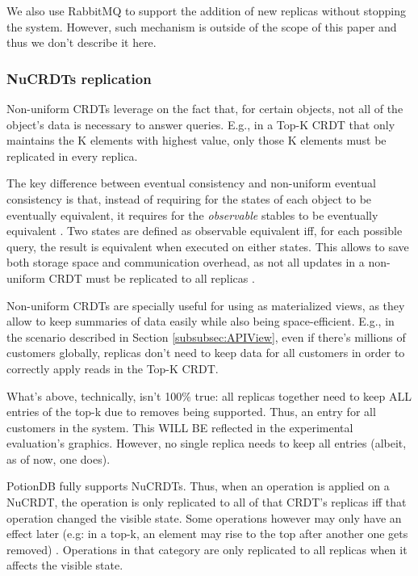 \documentclass{vldb}
\newcommand{\grumbler}[2]{{\color{red}{\bf #1:} #2}}
\newcommand{\andre}[1]{\grumbler{andre}{#1}}
\begin{document}
We also use RabbitMQ to support the addition of new replicas without stopping the system.
However, such mechanism is outside of the scope of this paper and thus we don't describe it here.

\subsubsection{NuCRDTs replication}
\label{subsubsec:nureplication}

Non-uniform CRDTs \cite{???} leverage on the fact that, for certain objects, not all of the object's data is necessary to answer queries.
E.g., in a Top-K CRDT that only maintains the K elements with highest value, only those K elements must be replicated in every replica.

The key difference between eventual consistency and non-uniform eventual consistency is that, instead of requiring for the states of each object to be eventually equivalent, it requires for the \emph{observable} stables to be eventually equivalent \cite{???}.
Two states are defined as observable equivalent iff, for each possible query, the result is equivalent when executed on either states.
This allows to save both storage space and communication overhead, as not all updates in a non-uniform CRDT must be replicated to all replicas \cite{???}.

Non-uniform CRDTs are specially useful for using as materialized views, as they allow to keep summaries of data easily while also being space-efficient.
E.g., in the scenario described in Section \ref{subsubsec:APIView}, even if there's millions of customers globally, replicas don't need to keep data for all customers in order to correctly apply reads in the Top-K CRDT.

\andre{What's above, technically, isn't 100\% true: all replicas together need to keep ALL entries of the top-k due to removes being supported. Thus, an entry for all customers in the system. This WILL BE reflected in the experimental evaluation's graphics. However, no single replica needs to keep all entries (albeit, as of now, one does).}

PotionDB fully supports NuCRDTs.
Thus, when an operation is applied on a NuCRDT, the operation is only replicated to all of that CRDT's replicas iff that operation changed the visible state.
Some operations however may only have an effect later (e.g: in a top-k, an element may rise to the top after another one gets removed) \cite{???}.
Operations in that category are only replicated to all replicas when it affects the visible state.
\end{document}

